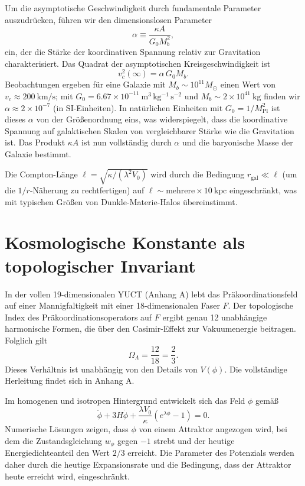 \documentclass[12pt,a4paper]{article}
\begin{document}
	Um die asymptotische Geschwindigkeit durch fundamentale Parameter auszudrücken, führen wir den dimensionslosen Parameter
	\begin{equation}
		\alpha \equiv \frac{\kappa A}{G_0 M_b^2},
		\label{eq:alpha}
	\end{equation}
	ein, der die Stärke der koordinativen Spannung relativ zur Gravitation charakterisiert. Das Quadrat der asymptotischen Kreisgeschwindigkeit ist
	\begin{equation}
		v_c^2(\infty) = \alpha\, G_0 M_b.
		\label{eq:vc-squared}
	\end{equation}
	Beobachtungen ergeben für eine Galaxie mit \(M_b \sim 10^{11}M_\odot\) einen Wert von \(v_c \approx 200\ \mathrm{km/s}\); mit \(G_0 = 6.67\times 10^{-11}\ \mathrm{m^3\,kg^{-1}\,s^{-2}}\) und \(M_b \sim 2\times 10^{41}\ \mathrm{kg}\) finden wir \(\alpha \approx 2 \times 10^{-7}\) (in SI-Einheiten). In natürlichen Einheiten mit \(G_0 = 1/M_{\mathrm{Pl}}^2\) ist dieses \(\alpha\) von der Größenordnung eins, was widerspiegelt, dass die koordinative Spannung auf galaktischen Skalen von vergleichbarer Stärke wie die Gravitation ist. Das Produkt \(\kappa A\) ist nun vollständig durch \(\alpha\) und die baryonische Masse der Galaxie bestimmt.
	
	Die Compton-Länge \(\ell = \sqrt{\kappa/(\lambda^2 V_0)}\) wird durch die Bedingung \(r_{\mathrm{gal}} \ll \ell\) (um die \(1/r\)-Näherung zu rechtfertigen) auf \(\ell \sim \text{mehrere}\times 10\ \mathrm{kpc}\) eingeschränkt, was mit typischen Größen von Dunkle-Materie-Halos übereinstimmt.
	
	\section{Kosmologische Konstante als topologischer Invariant}
	
	In der vollen 19-dimensionalen YUCT (Anhang A) lebt das Präkoordinationsfeld auf einer Mannigfaltigkeit mit einer 18-dimensionalen Faser \(F\). Der topologische Index des Präkoordinationsoperators auf \(F\) ergibt genau 12 unabhängige harmonische Formen, die über den Casimir-Effekt zur Vakuumenergie beitragen. Folglich gilt
	\begin{equation}
		\Omega_\Lambda = \frac{12}{18} = \frac{2}{3}.
		\label{eq:OmegaLambda}
	\end{equation}
	Dieses Verhältnis ist unabhängig von den Details von \(V(\phi)\). Die vollständige Herleitung findet sich in Anhang A.
	
	Im homogenen und isotropen Hintergrund entwickelt sich das Feld \(\phi\) gemäß
	\[
	\ddot\phi + 3H \dot\phi + \frac{\lambda V_0}{\kappa}(e^{\lambda\phi}-1) = 0.
	\]
	Numerische Lösungen zeigen, dass \(\phi\) von einem Attraktor angezogen wird, bei dem die Zustandsgleichung \(w_\phi\) gegen \(-1\) strebt und der heutige Energiedichteanteil den Wert \(2/3\) erreicht. Die Parameter des Potenzials werden daher durch die heutige Expansionsrate und die Bedingung, dass der Attraktor heute erreicht wird, eingeschränkt.
	
\end{document}
